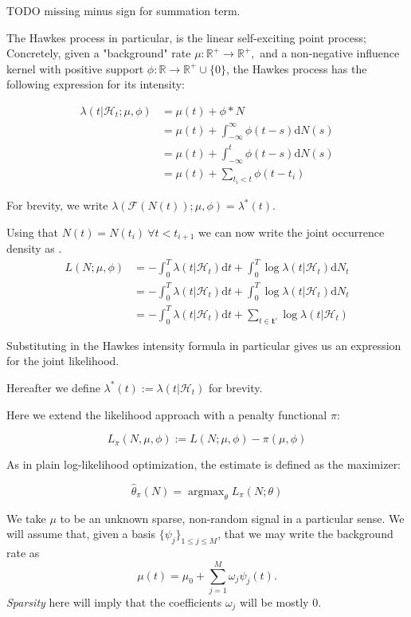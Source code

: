 \documentclass[11pt]{article}
\def\lt{<}
\newcommand{\dd}{\mathrm{d}}
\renewcommand{\v}[1]{\boldsymbol{#1}}
\newcommand{\cc}[1]{\mathcal{#1}}
\renewcommand{\cc}[1]{\mathcal{#1}}
\newcommand{\oo}[1]{\operatorname{#1}}
\begin{document}
TODO missing minus sign for summation term.

    The Hawkes process \cite{hawkes_point_1971} in particular, is the linear
self-exciting point process; Concretely, given a "background" rate
\(\mu:\mathbb{R}^+\rightarrow\mathbb{R}^+,\) and a non-negative
influence kernel with positive support
\(\phi:\mathbb{R}\rightarrow\mathbb{R}^+\cup\{0\}\), the Hawkes process
has the following expression for its intensity:

\[
\begin{aligned}
\lambda(t|\cc H_t;\mu,\phi) &= \mu(t) + \phi * N\\
&= \mu(t)  + \int_{-\infty}^{\infty}\phi(t-s)\dd N(s)\\
&= \mu(t) + \int_{-\infty}^{t}\phi(t-s)\dd N(s)\\
&= \mu(t) + \sum_{t_i\lt t}\phi(t-t_i)
\end{aligned}
\]

For brevity, we write
\(\lambda(\mathcal{F}(N(t));\mu,\phi)=\lambda^*(t)\).

    Using that \(N(t)=N(t_i)\ \forall t\lt t_{i+1}\) we can now write the
joint occurrence density as \cite{rubin_regular_1972}.
\[\begin{aligned}L(N;\mu,\phi) &=-\int_0^T\lambda(t|\cc H_t) \dd t + \int_0^T\log \lambda(t|\cc H_t) \dd N_t \\ 
    &=-\int_0^T\lambda(t|\cc H_t)\dd t + \int_0^T\log \lambda(t|\cc H_t) \dd N_t \\
    &=-\int_0^T\lambda(t|\cc H_t)\dd t + \sum_{t\in\v{t}'}\log \lambda(t|\cc H_t) 
\end{aligned}\]

    Substituting in the Hawkes intensity formula in particular gives us an
expression for the joint likelihood.

    Hereafter we define \(\lambda^*(t):=\lambda(t|\cc{H}_t)\) for brevity.

    Here we extend the likelihood approach with a penalty functional
\(\pi\):

\[L_\pi(N, \mu, \phi):= L(N; \mu, \phi)- \pi(\mu, \phi)\]

As in plain log-likelihood optimization, the estimate is defined as the
maximizer:

\[\hat{\theta}_\pi(N) = \oo{argmax}_\theta L_\pi(N;\theta)\]

    We take \(\mu\) to be an unknown sparse, non-random signal in a
particular sense. We will assume that, given a basis
\(\{\psi_j \}_{1\leq j\leq M}\), that we may write the background rate
as \[\mu(t) = \mu_0 + \sum_{j=1}^M  \omega_j \psi_j(t).\]
\emph{Sparsity} here will imply that the coefficients \(\omega_j\) will
be mostly 0.
\end{document}
